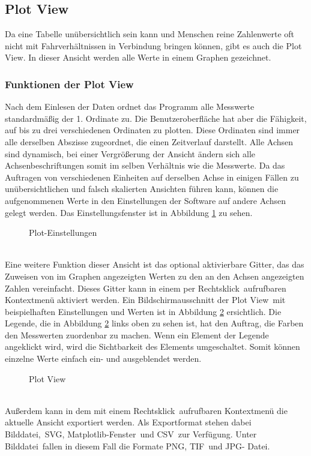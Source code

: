 \subsection{Plot View}
\label{subsec:VisPlotView}
Da eine Tabelle unübersichtlich sein kann und Menschen reine Zahlenwerte oft nicht mit Fahrverhältnissen in Verbindung bringen können, gibt es auch die \glqq Plot View\grqq . In dieser Ansicht werden alle Werte in einem Graphen gezeichnet.
\subsubsection{Funktionen der Plot View}
\label{subsubsec:PlotViewFunktion}
Nach dem Einlesen der Daten ordnet das Programm alle Messwerte standardmäßig der 1. Ordinate zu. Die Benutzeroberfläche hat aber die Fähigkeit, auf bis zu drei verschiedenen Ordinaten zu plotten. Diese Ordinaten sind immer alle derselben Abszisse zugeordnet, die einen Zeitverlauf darstellt. Alle Achsen sind dynamisch, bei einer Vergrößerung der Ansicht ändern sich alle Achsenbeschriftungen somit im selben Verhältnis wie die Messwerte. Da das Auftragen von verschiedenen Einheiten auf derselben Achse in einigen Fällen zu unübersichtlichen und falsch skalierten Ansichten führen kann, können die aufgenommenen Werte in den Einstellungen der Software auf andere Achsen gelegt werden. Das Einstellungsfenster ist in Abbildung \ref{fig:plotsettings} zu sehen.
\begin{figure}[h]
\centering
\missingfigure{}
\caption{Plot-Einstellungen}
\label{fig:plotsettings}
\end{figure}
\\
Eine weitere Funktion dieser Ansicht ist das optional aktivierbare Gitter, das das Zuweisen von im Graphen angezeigten Werten zu den an den Achsen angezeigten Zahlen vereinfacht. Dieses Gitter kann in einem per \glqq Rechtsklick\grqq \ aufrufbaren Kontextmenü aktiviert werden. Ein Bildschirmausschnitt der \glqq Plot View\grqq \ mit beispielhaften Einstellungen und Werten ist in Abbildung \ref{fig:PlotView} ersichtlich. Die Legende, die in Abbildung \ref{fig:PlotView} links oben zu sehen ist, hat den Auftrag, die Farben den Messwerten zuordenbar zu machen. Wenn ein Element der Legende angeklickt wird, wird die Sichtbarkeit des Elements umgeschaltet. Somit können einzelne Werte einfach ein- und ausgeblendet werden.
\begin{figure}[h]
\centering
\missingfigure{}
\caption{Plot View}
\label{fig:PlotView}
\end{figure}
\\
Außerdem kann in dem mit einem \glqq Rechtsklick\grqq \ aufrufbaren Kontextmenü die aktuelle Ansicht exportiert werden. Als Exportformat stehen dabei \glqq Bilddatei\grqq ,\ \glqq \ac{SVG}\grqq , \glqq Matplotlib-Fenster\grqq\ und \glqq \ac{CSV}\grqq\ zur Verfügung. Unter \glqq Bilddatei\grqq\ fallen in diesem Fall die Formate \glqq\ac{PNG}\grqq , \glqq\ac{TIF}\grqq\ und \glqq\ac{JPG}- Datei\grqq .

